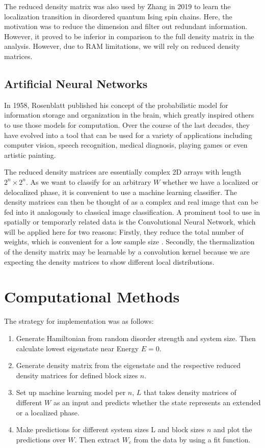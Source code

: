 \documentclass[reprint,amsmath,amssymb,aps,prb]{revtex4-2}
\begin{document}
The reduced density matrix was also used by Zhang in 2019 to learn the localization transition in disordered quantum Ising spin chains. Here, the motivation was to reduce the dimension and filter out redundant information. However, it proved to be inferior in comparison to the full density matrix in the analysis. \cite{Zhang2019} However, due to RAM limitations, we will rely on reduced density matrices.


\subsection{Artificial Neural Networks}

In 1958, Rosenblatt published his concept of the probabilistic model for information storage and organization in the brain, which greatly inspired others to use those models for computation.\cite{Rosenblatt1958} Over the course of the last decades, they have evolved into a tool that can be used for a variety of applications including computer vision, speech recognition, medical diagnosis, playing games or even artistic painting.\cite{Gatys2015}

The reduced density matrices are essentially complex 2D arrays with length $2^n\times2^n$. As we want to classify for an arbitrary $W$ whether we have a localized or delocalized phase, it is convenient to use a machine learning classifier. The density matrices can then be thought of as a complex and real image that can be fed into it analogously to classical image classification. A prominent tool to use in spatially or temporarly related data is the Convolutional Neural Network, which will be applied here for two reasons: Firstly, they reduce the total number of weights, which is convenient for a low sample size \cite{Schmidhuber2015}. Secondly, the thermalization of the density matrix may be learnable by a convolution kernel because we are expecting the density matrices to show different local distributions.


\section{Computational Methods}

The strategy for implementation was as follows:

\begin{enumerate}
	\item Generate Hamiltonian from random disorder strength and system size. Then calculate lowest eigenstate near Energy $E = 0$.
	\item Generate density matrix from the eigenstate and the respective reduced density matrices for defined block sizes $n$.
	\item  Set up machine learning model per $n$, $L$ that takes density matrices of different $W$ as an input and predicts whether the state represents an extended or a localized phase.
	\item Make predictions for different system sizes L and block sizes $n$ and plot the predictions over $W$. Then extract $W_c$	from the data by using a fit function.
\end{enumerate}
\end{document}
